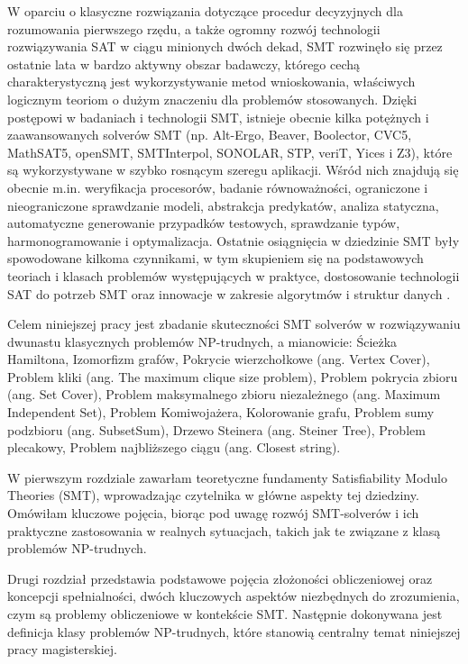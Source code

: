 \documentclass[xodstep]{wnspt}
\begin{document}
W oparciu o klasyczne rozwiązania dotyczące procedur decyzyjnych dla rozumowania pierwszego rzędu, a także ogromny rozwój technologii rozwiązywania SAT w ciągu minionych dwóch dekad,
SMT rozwinęło się przez ostatnie lata w bardzo aktywny obszar badawczy, którego cechą charakterystyczną jest wykorzystywanie metod wnioskowania, właściwych logicznym teoriom o dużym znaczeniu dla problemów stosowanych.
Dzięki postępowi w badaniach i technologii SMT, istnieje obecnie kilka potężnych i zaawansowanych solverów SMT (np. Alt-Ergo, Beaver, Boolector, CVC5, MathSAT5, openSMT, SMTInterpol, SONOLAR, STP, veriT, Yices i Z3), które są wykorzystywane w szybko rosnącym szeregu aplikacji. Wśród nich znajdują się obecnie m.in. weryfikacja procesorów, badanie równoważności, ograniczone i nieograniczone sprawdzanie modeli, abstrakcja predykatów, analiza statyczna, automatyczne generowanie przypadków testowych, sprawdzanie typów, harmonogramowanie i optymalizacja.
Ostatnie osiągnięcia w dziedzinie SMT były spowodowane kilkoma czynnikami, w tym skupieniem się na podstawowych teoriach i klasach problemów występujących w praktyce, dostosowanie technologii SAT do potrzeb SMT oraz innowacje w zakresie algorytmów i struktur danych \cite{Clarke18}.

Celem niniejszej pracy jest zbadanie skuteczności SMT solverów w rozwiązywaniu dwunastu klasycznych problemów NP-trudnych, a mianowicie: Ścieżka Hamiltona, Izomorfizm grafów, Pokrycie wierzchołkowe (ang. Vertex Cover), Problem kliki (ang. The maximum clique size problem), Problem pokrycia zbioru (ang. Set Cover), Problem maksymalnego zbioru niezależnego (ang. Maximum Independent Set), Problem Komiwojażera, Kolorowanie grafu, Problem sumy podzbioru (ang. SubsetSum), Drzewo Steinera (ang. Steiner Tree), Problem plecakowy, Problem najbliższego ciągu (ang. Closest string).

W pierwszym rozdziale zawarłam teoretyczne fundamenty Satisfiability Modulo Theories (SMT), wprowadzając czytelnika w główne aspekty tej dziedziny. Omówiłam kluczowe pojęcia, biorąc pod uwagę rozwój SMT-solverów i ich praktyczne zastosowania w realnych sytuacjach, takich jak te związane z klasą problemów NP-trudnych. 

Drugi rozdział przedstawia podstawowe pojęcia złożoności obliczeniowej oraz koncepcji spełnialności, dwóch kluczowych aspektów niezbędnych do zrozumienia, czym są problemy obliczeniowe w kontekście SMT. Następnie dokonywana jest definicja klasy problemów NP-trudnych, które stanowią centralny temat niniejszej pracy magisterskiej.
\end{document}
